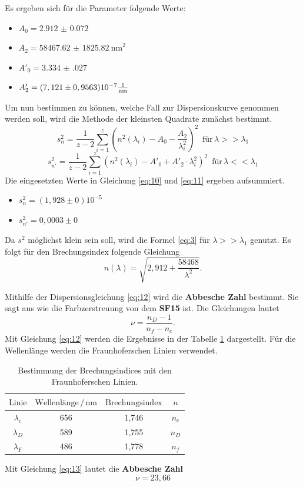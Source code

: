 Es ergeben sich für die Parameter folgende Werte:
\begin{itemize}
  \item $A_0 = \num{2.912(0072)}$
  \item $A_2 = \SI{58467.62(182582)}{\nano\meter}^2$
  \item $A'_0 = \num{3.334(027)}$
  \item $A'_2 = (7,121 \pm 0,9563)10^{-7} \si[per-mode=fraction]{\per\nano\meter}$
\end{itemize}
Um nun bestimmen zu können, welche Fall zur Dispersionskurve genommen werden soll, wird
die Methode der kleinsten Quadrate zunächst bestimmt.
\begin{equation*}
  s^2_n = \frac{1}{z-2} \sum_{i=1}^{z}(n^2(\lambda_i)-A_0-\frac{A_2}{\lambda^2_i})^2 \,\,\, \text{für} \, \lambda >> \lambda_1
  \label{eq:10}
\end{equation*}
\begin{equation*}
  s^2_{n'} = \frac{1}{z-2} \sum_{i=1}^{z}(n^2(\lambda_i)-A'_0+A'_2 \cdot \lambda^2_i)^2 \,\,\, \text{für} \, \lambda << \lambda_1
  \label{eq:11}
\end{equation*}
Die eingesetzten Werte in Gleichung \ref{eq:10} und \ref{eq:11} ergeben aufsummiert.
\begin{itemize}
  \item $s^2_n = (1,928 \pm 0)10^{-5}$
  \item $s^2_{n'} = 0,0003 \pm 0$
\end{itemize}
Da $s^2$ möglichst klein sein soll, wird die Formel \ref{eq:3} für $\lambda >> \lambda_1$ genutzt.
Es folgt für den Brechungsindex folgende Gleichung
\begin{equation}
  n(\lambda)= \sqrt{2,912 + \frac{58468}{\lambda^2}}.
  \label{eq:12}
\end{equation}

Mithilfe der Dispersionsgleichung \ref{eq:12} wird die \textbf{Abbesche Zahl} bestimmt.
Sie sagt aus wie die Farbzerstreuung von dem \textbf{SF15} ist.
Die Gleichungen lautet
\begin{equation}
  \nu = \frac{n_D -1}{n_f-n_c}.
  \label{eq:13}
\end{equation}
Mit Gleichung \ref{eq:12} werden die Ergebnisse in der Tabelle \ref{tab:3}
dargestellt. Für die Wellenlänge werden die Fraunhoferschen Linien verwendet.
\begin{table}[H]
  \centering
  \caption{Bestimmung der Brechungsindices mit den Fraunhoferschen Linien.}
  \label{tab:3}
  \begin{tabular}{c c c c }
    \toprule
    $\text{Linie}$ & $\text{Wellenlänge} \,/\,\si{\nano\meter}$ & $\text{Brechungsindex}$ &$n$\\
    \midrule
    $\lambda_c$ & 656 & 1,746 & $n_c$\\
    $\lambda_D$ & 589 & 1,755 & $n_D$\\
    $\lambda_F$ & 486 & 1,778 & $n_f$\\
    \bottomrule
  \end{tabular}
\end{table}
Mit Gleichung \ref{eq:13} lautet die \textbf{Abbesche Zahl}
\begin{equation*}
  \nu = 23,66
\end{equation*}

